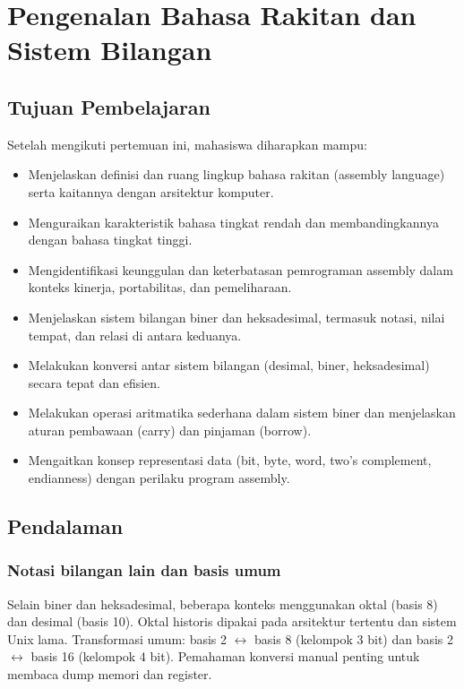 \chapter{Pengenalan Bahasa Rakitan dan Sistem Bilangan}\label{ch:pengenalan}

\section{Tujuan Pembelajaran}\label{sec:pengenalan-tujuan}
Setelah mengikuti pertemuan ini, mahasiswa diharapkan mampu:
\begin{itemize}
    \item Menjelaskan definisi dan ruang lingkup bahasa rakitan (assembly language) serta kaitannya dengan arsitektur komputer.
    \item Menguraikan karakteristik bahasa tingkat rendah dan membandingkannya dengan bahasa tingkat tinggi.
    \item Mengidentifikasi keunggulan dan keterbatasan pemrograman assembly dalam konteks kinerja, portabilitas, dan pemeliharaan.
    \item Menjelaskan sistem bilangan biner dan heksadesimal, termasuk notasi, nilai tempat, dan relasi di antara keduanya.
    \item Melakukan konversi antar sistem bilangan (desimal, biner, heksadesimal) secara tepat dan efisien.
    \item Melakukan operasi aritmatika sederhana dalam sistem biner dan menjelaskan aturan pembawaan (carry) dan pinjaman (borrow).
    \item Mengaitkan konsep representasi data (bit, byte, word, two's complement, endianness) dengan perilaku program assembly.
\end{itemize}

\section{Pendalaman}\label{sec:pengenalan-pendalaman}
\subsection{Notasi bilangan lain dan basis umum}
Selain biner dan heksadesimal, beberapa konteks menggunakan oktal (basis 8) dan desimal (basis 10). Oktal historis dipakai pada arsitektur tertentu dan sistem Unix lama. Transformasi umum: basis 2 \(\leftrightarrow\) basis 8 (kelompok 3 bit) dan basis 2 \(\leftrightarrow\) basis 16 (kelompok 4 bit). Pemahaman konversi manual penting untuk membaca dump memori dan register. \cite{osdev_wiki}

